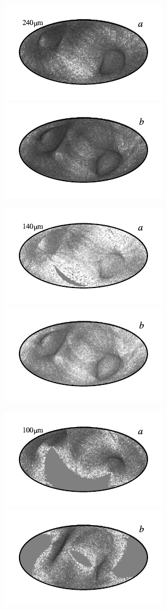\documentclass{aa}
\begin{document}
\begin{figure}
	\centering
	\includegraphics{figs/rms_maps/rms_10a_c0001_000022.pdf}\includegraphics{figs/rms_maps/rms_10b_c0001_000022.pdf}
  \vspace*{-0.85cm}

	\includegraphics{figs/rms_maps/rms_09a_c0001_000022.pdf}\includegraphics{figs/rms_maps/rms_09b_c0001_000022.pdf}
  \vspace*{-0.85cm}

	\includegraphics{figs/rms_maps/rms_08a_c0001_000022.pdf}\includegraphics{figs/rms_maps/rms_08b_c0001_000022.pdf}
  \vspace*{-0.85cm}


\end{figure}
\end{document}
